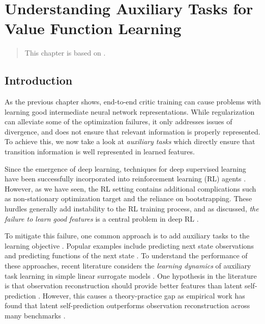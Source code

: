 \chapter{Understanding Auxiliary Tasks for Value Function Learning}
\label{chap:understanding}

\begin{quote}
    This chapter is based on .
\end{quote}

\section{Introduction}

As the previous chapter shows, end-to-end critic training can cause problems with learning good intermediate neural network representations.
While regularization can alleviate some of the optimization failures, it only addresses issues of divergence, and does not ensure that relevant information is properly represented.
To achieve this, we now take a look at \emph{auxiliary tasks} which directly ensure that transition information is well represented in learned features.

Since the emergence of deep learning, techniques for deep supervised learning have been successfully incorporated into reinforcement learning (RL) agents \parencite{mnih2013playing,ddpg}.
However, as we have seen, the RL setting contains additional complications such as non-stationary optimization target and the reliance on bootstrapping.
These hurdles generally add instability to the RL training process, and as discussed, \emph{the failure to learn good features} is a central problem in deep RL \parencite{kumar2021implicit,lyle2022understanding,nikishin2022primacy,hussing2024dissecting}.

To mitigate this failure, one common approach is to add auxiliary tasks to the learning objective \parencite{jaderberg2017reinforcement}. 
Popular examples include predicting next state observations \parencite{jaderberg2016reinforcement} and predicting functions of the next state \parencite{schwarzer2021dataefficient,ni2024bridging}.
To understand the performance of these approaches, recent literature \parencite{tang2022understanding,lelan2023bootstrapped} considers the \emph{learning dynamics} of auxiliary task learning in simple linear surrogate models \parencite{saxe2014exact}.
One hypothesis in the literature is that observation reconstruction should provide better features than latent self-prediction \parencite{behzadian2019fast,tang2022understanding}. 
However, this causes a theory-practice gap as empirical work has found that latent self-prediction outperforms observation reconstruction across many benchmarks \parencite{schwarzer2021dataefficient,ni2024bridging}.

